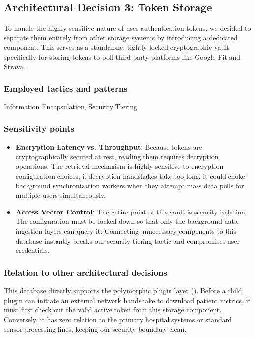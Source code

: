 \subsection*{Architectural Decision 3: Token Storage}

To handle the highly sensitive nature of user authentication tokens, we decided to separate them entirely from other storage systems by introducing a dedicated  component. This serves as a standalone, tightly locked cryptographic vault specifically for storing tokens to poll third-party platforms like Google Fit and Strava.

\subsubsection*{Employed tactics and patterns}
Information Encapsulation, Security Tiering

\subsubsection*{Sensitivity points}
\begin{itemize}
	\item \textbf{Encryption Latency vs. Throughput:} Because tokens are cryptographically secured at rest, reading them requires decryption operations. The retrieval mechanism is highly sensitive to encryption configuration choices; if decryption handshakes take too long, it could choke background synchronization workers when they attempt mass data polls for multiple users simultaneously.
	\item \textbf{Access Vector Control:} The entire point of this vault is security isolation. The configuration must be locked down so that only the background data ingestion layers can query it. Connecting unnecessary components to this database instantly breaks our security tiering tactic and compromises user credentials.
\end{itemize}

\subsubsection*{Relation to other architectural decisions}
This database directly supports the polymorphic plugin layer (). Before a child plugin can initiate an external network handshake to download patient metrics, it must first check out the valid active token from this storage component. Conversely, it has zero relation to the primary hospital systems or standard sensor processing lines, keeping our security boundary clean.

